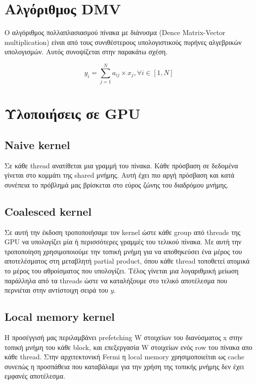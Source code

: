 







\setcounter{section}{1}

\section{Αλγόριθμος DMV}
Ο αλγόριθμος πολλαπλασιασμού πίνακα με διάνυσμα (Dence Matrix-Vector
multiplication) είναι από τους συνιθέστερους υπολογιστικούς πυρήνες αλγεβρικών
υπολογισμών. Αυτός συνοψίζεται στην παρακάτω σχέση.

\[
    y_i = \sum_{j=1}^{N}a_{ij}\times x_{j}, \forall i \in [1,N]
\]



\section{Υλοποιήσεις σε GPU}

\subsection{Naive kernel}
Σε κάθε thread ανατίθεται μια γραμμή του πίνακα.
Κάθε πρόσβαση σε δεδομένα γίνεται στο κομμάτι της shared μνήμης. Αυτή έχει πιο
αργή πρόσβαση και κατά συνέπεια το πρόβλημά μας βρίσκεται στο εύρος ζώνης του
διαδρόμου μνήμης.

\subsection{Coalesced kernel}
Σε αυτή την έκδοση τροποποιήσαμε τον kernel ώστε κάθε group από threads της
GPU να υπολογίζει μία ή περισσότερες γραμμές του τελικού πίνακα. Με αυτή την
τροποποίηση χρησιμοποιούμε την τοπική μνήμη για να αποθηκεύσει ένα μέρος του
αποτελέσματος στη μεταβλητή partial product, όπου κάθε thread τοποθετεί ατομικά
το μέρος του αθροίσματος που υπολογίζει. Τέλος γίνεται μια λογαριθμική μείωση
παράλληλα από τα threads ώστε να καταλήξουμε στο τελικό αποτέλεσμα που
περνιέται στην αντίστοιχη σειρά του $y$.


\subsection{Local memory kernel}
Η προσέγγισή μας περιλαμβάνει prefetching W στοιχείων του διανύσματος x στην
τοπική μνήμη του κάθε block, και επεξεργασία W στοιχείων ενός row του πίνακα
απο κάθε thread. 
Στην αρχιτεκτονική Fermi η local memory χρησιμοποιείται ως cache συνεπώς η
προσπάθεια που καταβάλαμε για την χρήση της τοπικής μνήμης δεν έχει εμφανές
αποτέλεσμα.




